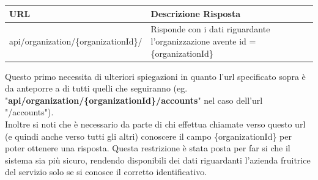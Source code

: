 	\begin{small}
		\begin{longtable}{ | l | p{8cm} | }
			\hline \textbf{URL} & \textbf{Descrizione Risposta}\\
			\hline api/organization/\{organizationId\}/ & Risponde con i dati riguardante l'organizzazione avente id = \{organizationId\}\\
			\hline
		\end{longtable}		
	\end{small}
Questo primo  necessita di ulteriori spiegazioni in quanto l'url specificato sopra è da anteporre a di tutti quelli che seguiranno (eg. "\textbf{api/organization/\{organizationId\}/accounts}" nel caso dell'url "/accounts").\\
Inoltre si noti che è necessario da parte di chi effettua chiamate verso questo url (e quindi anche verso tutti gli altri) conoscere il campo \{organizationId\} per poter ottenere una risposta. Questa restrizione è stata posta per far si che il sistema sia più sicuro, rendendo disponibili dei dati riguardanti l'azienda fruitrice del servizio solo se si conosce il corretto identificativo.

